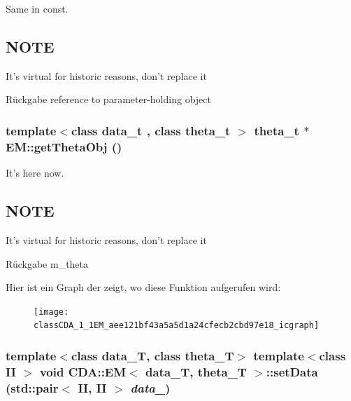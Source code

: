 Same in const. 

\hypertarget{GaussianMixtureModel1D_8h_09_09_NOTE}{}\subsection{NOTE}\label{GaussianMixtureModel1D_8h_09_09_NOTE}
It's virtual for historic reasons, don't replace it

\begin{DoxyReturn}{Rückgabe}
reference to parameter-\/holding object 
\end{DoxyReturn}
\hypertarget{classCDA_1_1EM_aee121bf43a5a5d1a24cfecb2cbd97e18}{
\subsubsection[{getThetaObj}]{\setlength{\rightskip}{0pt plus 5cm}template$<$class data\_\-t , class theta\_\-t $>$ theta\_\-t $\ast$ EM::getThetaObj ()}}
\label{classCDA_1_1EM_aee121bf43a5a5d1a24cfecb2cbd97e18}


It's here now. 

\hypertarget{GaussianMixtureModel1D_8h_09_09_NOTE}{}\subsection{NOTE}\label{GaussianMixtureModel1D_8h_09_09_NOTE}
It's virtual for historic reasons, don't replace it

\begin{DoxyReturn}{Rückgabe}
m\_\-theta 
\end{DoxyReturn}


Hier ist ein Graph der zeigt, wo diese Funktion aufgerufen wird:\nopagebreak
\begin{figure}[H]
\begin{center}
\leavevmode
\texttt{[image: classCDA\_1\_1EM\_aee121bf43a5a5d1a24cfecb2cbd97e18\_icgraph]}
\end{center}
\end{figure}


\hypertarget{classCDA_1_1EM_ad1ee8ed5cef87cfabf708fe8d469b77f}{
\subsubsection[{setData}]{\setlength{\rightskip}{0pt plus 5cm}template$<$class data\_\-T, class theta\_\-T$>$ template$<$class II $>$ void {\bf CDA::EM}$<$ data\_\-T, theta\_\-T $>$::setData (std::pair$<$ II, II $>$ {\em data\_\-})}}
\label{classCDA_1_1EM_ad1ee8ed5cef87cfabf708fe8d469b77f}


